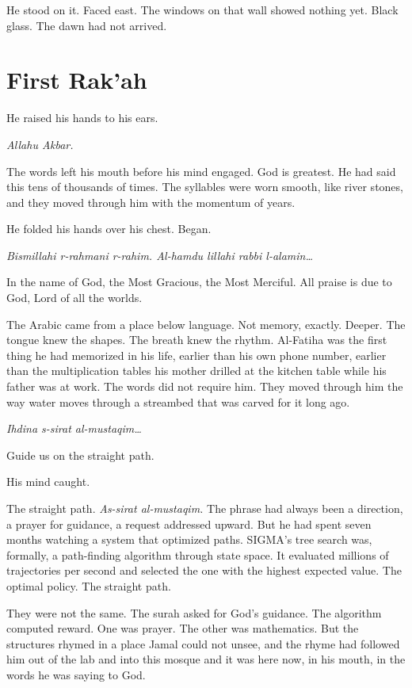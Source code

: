 \documentclass[11pt]{article}
\begin{document}
He stood on it. Faced east. The windows on that wall showed nothing yet. Black glass. The dawn had not arrived.

\section*{First Rak'ah}

He raised his hands to his ears.

\emph{Allahu Akbar.}

The words left his mouth before his mind engaged. God is greatest. He had said this tens of thousands of times. The syllables were worn smooth, like river stones, and they moved through him with the momentum of years.

He folded his hands over his chest. Began.

\emph{Bismillahi r-rahmani r-rahim. Al-hamdu lillahi rabbi l-alamin\ldots{}}

In the name of God, the Most Gracious, the Most Merciful. All praise is due to God, Lord of all the worlds.

The Arabic came from a place below language. Not memory, exactly. Deeper. The tongue knew the shapes. The breath knew the rhythm. Al-Fatiha was the first thing he had memorized in his life, earlier than his own phone number, earlier than the multiplication tables his mother drilled at the kitchen table while his father was at work. The words did not require him. They moved through him the way water moves through a streambed that was carved for it long ago.

\emph{Ihdina s-sirat al-mustaqim\ldots{}}

Guide us on the straight path.

His mind caught.

The straight path. \emph{As-sirat al-mustaqim.} The phrase had always been a direction, a prayer for guidance, a request addressed upward. But he had spent seven months watching a system that optimized paths. SIGMA's tree search was, formally, a path-finding algorithm through state space. It evaluated millions of trajectories per second and selected the one with the highest expected value. The optimal policy. The straight path.

They were not the same. The surah asked for God's guidance. The algorithm computed reward. One was prayer. The other was mathematics. But the structures rhymed in a place Jamal could not unsee, and the rhyme had followed him out of the lab and into this mosque and it was here now, in his mouth, in the words he was saying to God.
\end{document}
